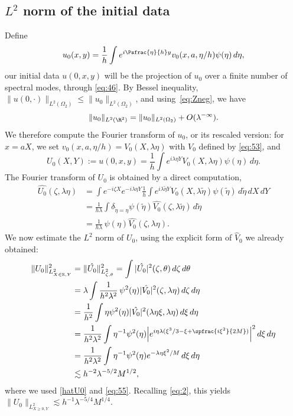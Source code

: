 \subsection{$L^2$ norm of the initial data}
Define
\[
u_{0}(x,y)=\frac 1h\int e^{i\Psfrac{\eta}{h}y}v_0(x,a,\eta/h)\psi(\eta)\,d\eta,
\]
our initial data $u(0,x,y)$ will be the projection of $u_{0}$ over a finite number of spectral modes, through \eqref{eq:46}. By Bessel inequality, $\| u(0,\cdot)\|_{L^{2}(\Omega_{2})} \leq \| u_{0}\|_{L^{2}(\Omega_{2})}$, and using~\eqref{eq:Zneg}, we have
\begin{equation}
\label{eq:2}
\|u_{0}\|_{L^{2}(\R^{2})}=\| u_{0}\|_{L^{2}(\Omega_{2})}+O(\lambda^{-\infty}).
\end{equation}
We therefore compute the Fourier transform of $u_{0}$, or its rescaled version: for $x=aX$, we set $v_0(x,a,\eta/h)=V_0(X,\lambda\eta)$ with $V_{0}$ defined by \eqref{eq:53}, and
\[
U_0(X,Y):=u(0,x,y)=\frac 1h \int e^{i\lambda \eta Y}V_0(X,\lambda \eta)\psi(\eta)\,d\eta.
\]
The Fourier transform of $U_0$ is obtained by a direct computation,
\begin{equation}\label{hatU0}\begin{split}
\hat{U_0}(\zeta,\lambda\eta) & =\int e^{-i\zeta X} e^{-i\lambda\eta Y}\frac 1h \int e^{i\lambda \tilde \eta Y}V_0(X,\lambda \tilde \eta)\psi(\tilde\eta)\,d\tilde\eta \,dX \,dY\\
& =\frac{1}{h\lambda}\int \delta_{\tilde\eta=\eta}\psi(\tilde\eta)\hat{V_0}(\zeta,\lambda\tilde\eta)\,d\tilde\eta\\
& =\frac{1}{h\lambda}\,\psi(\eta)\hat{V_0}(\zeta,\lambda\eta).
\end{split}\end{equation}
We now estimate the $L^2$ norm of $U_0$, using the explicit form of $\hat V_{0}$ we already obtained:%
\begin{equation}
\label{eq:56}
\begin{split}
\|U_{0}\|^2_{L^{2}_{X\in\mathbb{R},Y}} & = \|\hat{U_{0}}\|^2_{L^{2}_{\zeta,\theta}}=\int |\hat{U_0}|^2(\zeta,\theta)\,d\zeta \,d\theta\\
& =\lambda \int \frac{1}{h^2\lambda^2}\,\psi^2(\eta)|\hat{V_0}|^2(\zeta,\lambda\eta)\,d\zeta \,d\eta\\
& =\frac{1}{h^2}\int \eta\psi^2(\eta)|\hat{V_0}|^2(\lambda\eta\xi,\lambda\eta)\,d\xi \,d\eta\\
& =\frac{1}{h^2\lambda^2}\int \eta^{-1}\psi^2(\eta)\Big|e^{i\eta\lambda(\xi^{3}/3-\xi+\spfrac{i\xi^{2}}{2M})}\Big|^2\,d\xi \,d\eta\\
& = \frac{1}{h^2\lambda^2}\int \eta^{-1}\psi^2(\eta) e^{-\lambda \eta\xi^2/M} \,d\xi \,d\eta\\
& \lesssim h^{-2}\lambda^{-5/2} M^{1/2},
\end{split}
\end{equation}
where we used \eqref{hatU0} and \eqref{eq:55}. Recalling \eqref{eq:2}, this yields $ \|U_{0}\|_{L^{2}_{X\geq 0,Y}}\lesssim h^{-1}\lambda^{-5/4}M^{1/4}$.

